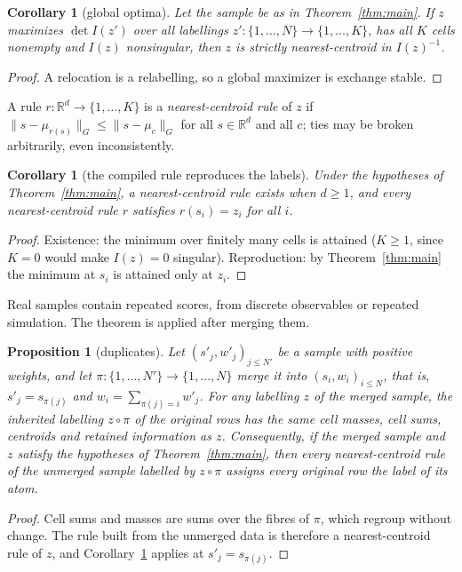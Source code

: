 \documentclass[11pt]{amsart}
\newtheorem{proposition}[theorem]{Proposition}
\newtheorem{corollary}[theorem]{Corollary}
\theoremstyle{definition}
\theoremstyle{remark}
\newcommand{\R}{\mathbb{R}}
\newcommand{\Ib}{I(z)}
\begin{document}
\begin{corollary}[global optima]\label{cor:global}
Let the sample be as in Theorem~\ref{thm:main}. If $z$ maximizes $\det I(z')$ over all labellings
$z':\{1,\dots,N\}\to\{1,\dots,K\}$, has all $K$ cells nonempty and $\Ib$ nonsingular, then $z$ is
strictly nearest-centroid in $\Ib^{-1}$.
\end{corollary}

\begin{proof}
A relocation is a relabelling, so a global maximizer is exchange stable.
\end{proof}

A rule $r:\R^d\to\{1,\dots,K\}$ is a \emph{nearest-centroid rule} of $z$ if
$\|s-\mu_{r(s)}\|_G\le\|s-\mu_c\|_G$ for all $s\in\R^d$ and all $c$; ties may be broken
arbitrarily, even inconsistently.

\begin{corollary}[the compiled rule reproduces the labels]\label{cor:compile}
Under the hypotheses of Theorem~\ref{thm:main}, a nearest-centroid rule exists when $d\ge1$,
and every nearest-centroid rule $r$ satisfies $r(s_i)=z_i$ for all $i$.
\end{corollary}

\begin{proof}
Existence: the minimum over finitely many cells is attained ($K\ge1$, since $K=0$ would make
$\Ib=0$ singular). Reproduction: by Theorem~\ref{thm:main} the minimum at $s_i$ is attained only
at $z_i$.
\end{proof}

Real samples contain repeated scores, from discrete observables or repeated simulation. The
theorem is applied after merging them.

\begin{proposition}[duplicates]\label{prop:merge}
Let $(s'_j,w'_j)_{j\le N'}$ be a sample with positive weights, and let
$\pi:\{1,\dots,N'\}\to\{1,\dots,N\}$ merge it into $(s_i,w_i)_{i\le N}$, that is,
$s'_j=s_{\pi(j)}$ and $w_i=\sum_{\pi(j)=i}w'_j$. For any labelling $z$ of the merged sample, the
inherited labelling $z\circ\pi$ of the original rows has the same cell masses, cell sums,
centroids and retained information as $z$. Consequently, if the merged sample and $z$ satisfy the
hypotheses of Theorem~\ref{thm:main}, then every nearest-centroid rule of the unmerged sample
labelled by $z\circ\pi$ assigns every original row the label of its atom.
\end{proposition}

\begin{proof}
Cell sums and masses are sums over the fibres of $\pi$, which regroup without change. The rule
built from the unmerged data is therefore a nearest-centroid rule of $z$, and
Corollary~\ref{cor:compile} applies at $s'_j=s_{\pi(j)}$.
\end{proof}
\end{document}
